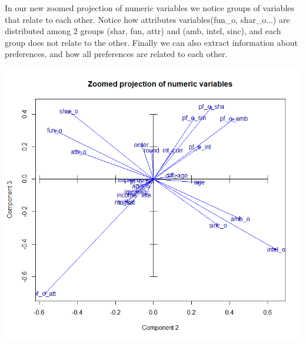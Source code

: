In our new zoomed projection of numeric variables we notice groups of variables that relate to each other. Notice how attributes variables(fun\_o, shar\_o...) are distributed among 2 groups (shar, fun, attr) and (amb, intel, sinc), and each group does not relate to the other. Finally we can also extract information about preferences, and how all preferences are related to each other.%
\begin{center}
\includegraphics[width=5.5in]{images/ACP/2-3iteration/proj-all-nums-2-3.png}
\label{fig:numproj23}
\end{center}

